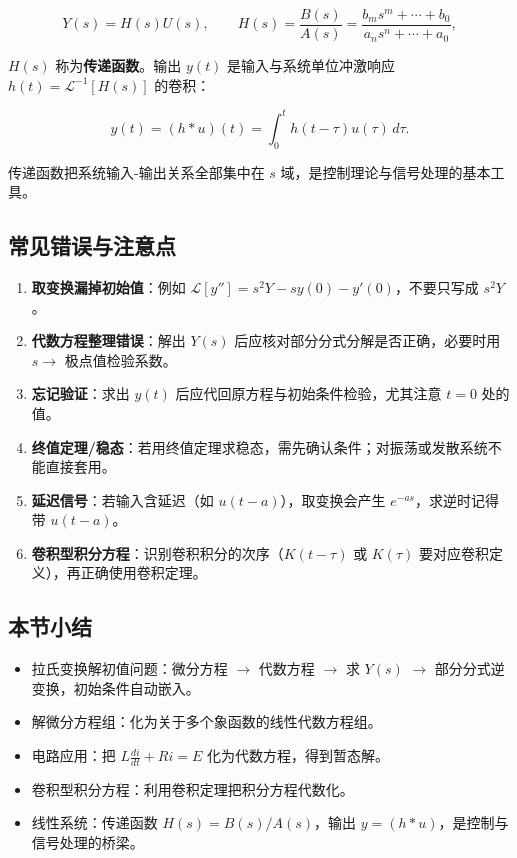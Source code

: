 \[
Y(s)=H(s)U(s),\qquad H(s)=\frac{B(s)}{A(s)}=\frac{b_m s^m+\cdots+b_0}{a_n s^n+\cdots+a_0},
\]

\(H(s)\) 称为\textbf{传递函数}。输出 \(y(t)\) 是输入与系统单位冲激响应
\(h(t)=\mathcal{L}^{-1}[H(s)]\) 的卷积：

\[
y(t)=(h*u)(t)=\int_0^{t}h(t-\tau)u(\tau)\,d\tau .
\]

传递函数把系统输入-输出关系全部集中在 \(s\)
域，是控制理论与信号处理的基本工具。

\subsection{常见错误与注意点}\label{ux5e38ux89c1ux9519ux8befux4e0eux6ce8ux610fux70b9-24}

\begin{enumerate}
\def\labelenumi{\arabic{enumi}.}
\tightlist
\item
  \textbf{取变换漏掉初始值}：例如
  \(\mathcal{L}[y'']=s^2Y-sy(0)-y'(0)\)，不要只写成 \(s^2Y\)。
\item
  \textbf{代数方程整理错误}：解出 \(Y(s)\)
  后应核对部分分式分解是否正确，必要时用 \(s\to\) 极点值检验系数。
\item
  \textbf{忘记验证}：求出 \(y(t)\)
  后应代回原方程与初始条件检验，尤其注意 \(t=0\) 处的值。
\item
  \textbf{终值定理/稳态}：若用终值定理求稳态，需先确认条件；对振荡或发散系统不能直接套用。
\item
  \textbf{延迟信号}：若输入含延迟（如 \(u(t-a)\)），取变换会产生
  \(e^{-as}\)，求逆时记得带 \(u(t-a)\)。
\item
  \textbf{卷积型积分方程}：识别卷积积分的次序（\(K(t-\tau)\) 或
  \(K(\tau)\) 要对应卷积定义），再正确使用卷积定理。
\end{enumerate}

\subsection{本节小结}\label{ux672cux8282ux5c0fux7ed3-24}

\begin{itemize}
\tightlist
\item
  拉氏变换解初值问题：微分方程 \(\to\) 代数方程 \(\to\) 求 \(Y(s)\)
  \(\to\) 部分分式逆变换，初始条件自动嵌入。
\item
  解微分方程组：化为关于多个象函数的线性代数方程组。
\item
  电路应用：把 \(L\frac{di}{dt}+Ri=E\) 化为代数方程，得到暂态解。
\item
  卷积型积分方程：利用卷积定理把积分方程代数化。
\item
  线性系统：传递函数 \(H(s)=B(s)/A(s)\)，输出
  \(y=(h*u)\)，是控制与信号处理的桥梁。
\end{itemize}

\newpage
